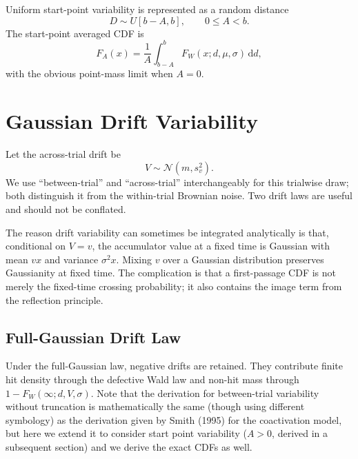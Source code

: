 \documentclass[12pt]{article}
\newcommand{\dd}{\,\mathrm{d}}
\newcommand{\Normal}{\mathcal{N}}
\begin{document}
Uniform start-point variability is represented as a random distance
\begin{equation}
  D\sim U[b-A,b], \qquad 0\le A<b.
\end{equation}
The start-point averaged CDF is
\begin{equation}
  F_A(x)=\frac{1}{A}\int_{b-A}^{b}F_W(x;d,\mu,\sigma)\dd d,
\end{equation}
with the obvious point-mass limit when $A=0$.

\section{Gaussian Drift Variability}
Let the across-trial drift be
\begin{equation}
  V\sim\Normal(m,s_v^2).
\end{equation}
We use ``between-trial'' and ``across-trial'' interchangeably for this trialwise draw; both distinguish it from the within-trial Brownian noise. Two drift laws are useful and should not be conflated.

The reason drift variability can sometimes be integrated analytically is that, conditional on $V=v$, the accumulator value at a fixed time is Gaussian with mean $vx$ and variance $\sigma^2x$. Mixing $v$ over a Gaussian distribution preserves Gaussianity at fixed time. The complication is that a first-passage CDF is not merely the fixed-time crossing probability; it also contains the image term from the reflection principle.

\subsection{Full-Gaussian Drift Law}
Under the full-Gaussian law, negative drifts are retained. They contribute finite hit density through the defective Wald law and non-hit mass through $1-F_W(\infty;d,V,\sigma)$. Note that the derivation for between-trial variability without truncation is mathematically the same (though using different symbology) as the derivation given by Smith (1995) for the coactivation model, but here we extend it to consider start point variability ($A > 0$, derived in a subsequent section) and we derive the exact CDFs as well.
\end{document}
